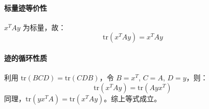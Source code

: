 \paragraph{标量迹等价性}  
\( x^T A y \) 为标量，故：
\[
\text{tr}(x^T A y) = x^T A y
\]

\paragraph{迹的循环性质}  
利用 \( \text{tr}(BCD) = \text{tr}(CDB) \)，令 \( B = x^T \), \( C = A \), \( D = y \)，则：
\[
\text{tr}(x^T A y) = \text{tr}(A y x^T)
\]
同理，\( \text{tr}(y x^T A) = \text{tr}(x^T A y) \)。综上等式成立。